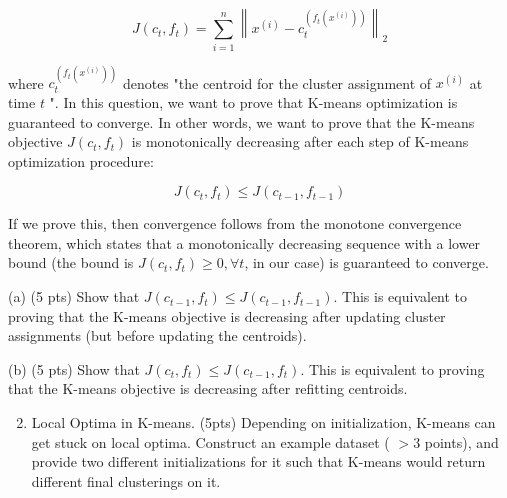 \documentclass[10pt]{article}
\begin{document}
$$
J\left(c_{t}, f_{t}\right)=\sum_{i=1}^{n}\left\|x^{(i)}-c_{t}^{\left(f_{t}\left(x^{(i)}\right)\right)}\right\|_{2}
$$

where $c_{t}^{\left(f_{t}\left(x^{(i)}\right)\right)}$ denotes "the centroid for the cluster assignment of $x^{(i)}$ at time $t$ ". In this question, we want to prove that K-means optimization is guaranteed to converge. In other words, we want to prove that the K-means objective $J\left(c_{t}, f_{t}\right)$ is monotonically decreasing after each step of K-means optimization procedure:

$$
J\left(c_{t}, f_{t}\right) \leq J\left(c_{t-1}, f_{t-1}\right)
$$

If we prove this, then convergence follows from the monotone convergence theorem, which states that a monotonically decreasing sequence with a lower bound (the bound is $J\left(c_{t}, f_{t}\right) \geq 0, \forall t$, in our case) is guaranteed to converge.

(a) (5 pts) Show that $J\left(c_{t-1}, f_{t}\right) \leq J\left(c_{t-1}, f_{t-1}\right)$. This is equivalent to proving that the K-means objective is decreasing after updating cluster assignments (but before updating the centroids).

(b) (5 pts) Show that $J\left(c_{t}, f_{t}\right) \leq J\left(c_{t-1}, f_{t}\right)$. This is equivalent to proving that the K-means objective is decreasing after refitting centroids.

\begin{enumerate}
  \setcounter{enumi}{1}
  \item Local Optima in K-means. (5pts) Depending on initialization, K-means can get stuck on local optima. Construct an example dataset ( $>3$ points), and provide two different initializations for it such that K-means would return different final clusterings on it.
\end{enumerate}
\end{document}
